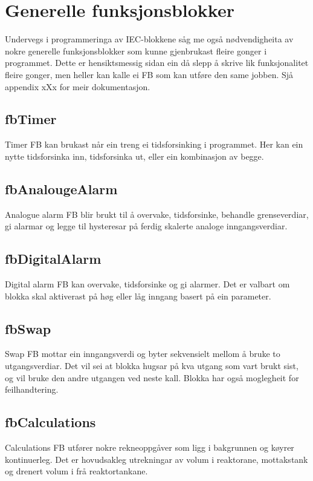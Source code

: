 \section{Generelle funksjonsblokker}
\thispagestyle{fancy}


Undervegs i programmeringa av \gls{IEC}-blokkene såg me også nødvendigheita av nokre generelle funksjonsblokker
som kunne gjenbrukast fleire gonger i programmet. Dette er hensiktsmessig sidan ein då slepp å skrive lik 
funksjonalitet fleire gonger, men heller kan kalle ei \gls{FB} som kan utføre den same jobben.\newline
Sjå appendix xXx for meir dokumentasjon.

\subsection{fbTimer}
Timer \gls{FB} kan brukast når ein treng ei tidsforsinking i programmet.
Her kan ein nytte tidsforsinka inn, tidsforsinka ut, eller ein kombinasjon av begge.

\subsection{fbAnalougeAlarm}
Analogue alarm \gls{FB} blir brukt til å overvake, tidsforsinke, behandle grenseverdiar, 
gi alarmar og legge til hysteresar på ferdig skalerte analoge inngangsverdiar.

\subsection{fbDigitalAlarm}
Digital alarm \gls{FB} kan overvake, tidsforsinke og gi alarmer. Det er valbart om blokka skal aktiverast på høg eller låg
inngang basert på ein parameter.

\subsection{fbSwap}
Swap \gls{FB} mottar ein inngangsverdi og byter sekvensielt mellom å bruke to utgangsverdiar. Det vil sei at blokka hugsar på kva utgang som vart brukt sist,
og vil bruke den andre utgangen ved neste kall. Blokka har også moglegheit for feilhandtering.

\subsection{fbCalculations}
Calculations \gls{FB} utfører nokre rekneoppgåver som ligg i bakgrunnen og køyrer kontinuerleg. 
Det er hovudsakleg utrekningar av volum i reaktorane, mottakstank og drenert volum i frå reaktortankane.

